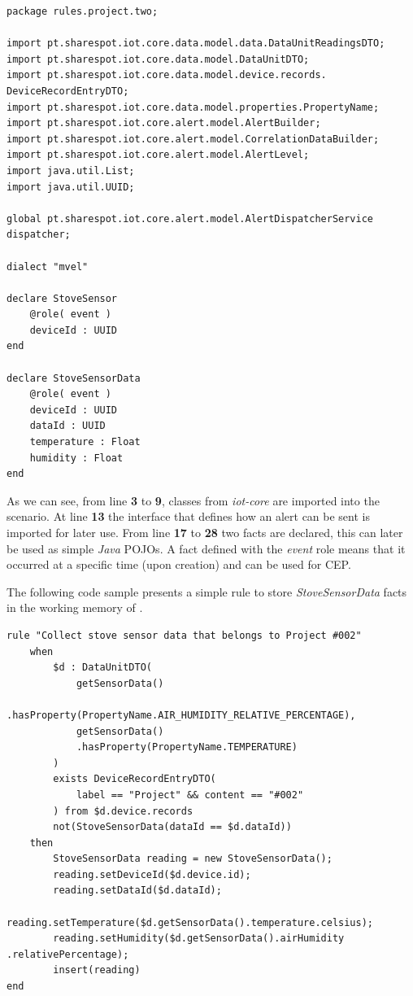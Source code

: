 \begin{lstlisting}[style=drools, caption=Rule Scenario Example - Part 1, label={code:implementation:description:rule:sample1}]
package rules.project.two;

import pt.sharespot.iot.core.data.model.data.DataUnitReadingsDTO;
import pt.sharespot.iot.core.data.model.DataUnitDTO;
import pt.sharespot.iot.core.data.model.device.records. DeviceRecordEntryDTO;
import pt.sharespot.iot.core.data.model.properties.PropertyName;
import pt.sharespot.iot.core.alert.model.AlertBuilder;
import pt.sharespot.iot.core.alert.model.CorrelationDataBuilder;
import pt.sharespot.iot.core.alert.model.AlertLevel;
import java.util.List;
import java.util.UUID;

global pt.sharespot.iot.core.alert.model.AlertDispatcherService dispatcher;

dialect "mvel"

declare StoveSensor
    @role( event )
    deviceId : UUID
end

declare StoveSensorData
    @role( event )
    deviceId : UUID
    dataId : UUID
    temperature : Float
    humidity : Float
end
\end{lstlisting}

As we can see, from line \textbf{3} to \textbf{9}, classes from \textit{iot-core} are imported into the scenario.
At line \textbf{13} the interface that defines how an alert can be sent is imported for later use.
From line \textbf{17} to \textbf{28} two facts are declared, this can later be used as simple \textit{Java} POJOs. A fact defined with the \textit{event} role means that it occurred at a specific time (upon creation) and can be used for \gls{CEP}.

The following code sample presents a simple rule to store \textit{StoveSensorData} facts in the working memory of .

\begin{lstlisting}[style=drools, caption=Rule Scenario Example - Part 2, label={code:implementation:description:rule:sample2}]
rule "Collect stove sensor data that belongs to Project #002"
    when
        $d : DataUnitDTO(
            getSensorData()
            .hasProperty(PropertyName.AIR_HUMIDITY_RELATIVE_PERCENTAGE),
            getSensorData()
            .hasProperty(PropertyName.TEMPERATURE)
        )
        exists DeviceRecordEntryDTO(
            label == "Project" && content == "#002"
        ) from $d.device.records
        not(StoveSensorData(dataId == $d.dataId))
    then
        StoveSensorData reading = new StoveSensorData();
        reading.setDeviceId($d.device.id);
        reading.setDataId($d.dataId);
        reading.setTemperature($d.getSensorData().temperature.celsius);
        reading.setHumidity($d.getSensorData().airHumidity .relativePercentage);
        insert(reading)
end
\end{lstlisting}

